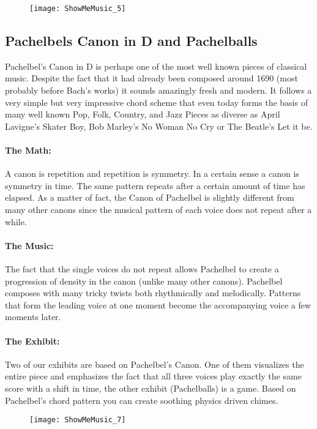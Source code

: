 \begin{figure}[h]
\centering
\texttt{[image: ShowMeMusic\_5]}
\end{figure}


\subsection{Pachelbels Canon in D and Pachelballs}
Pachelbel's Canon in D is perhaps one of the most well known pieces of classical music. Despite the fact that it had already been composed around 1690 (most probably before Bach's works) it sounds amazingly fresh and modern. It follows a very simple but very impressive chord scheme that even today forms the basis of many well known Pop, Folk, Country, and Jazz Pieces as diverse as April Lavigne's Skater Boy, Bob Marley's No Woman No Cry or The Beatle's Let it be.

\paragraph{The Math:} A canon is repetition and repetition is symmetry. In a certain sense a canon is symmetry in time. The same pattern repeats after a certain amount of time has elapsed. As a matter of fact, the Canon of Pachelbel is slightly different from many other canons since the musical pattern of each voice does not repeat after a while.

\paragraph{The Music:} The fact that the single voices do not repeat allows Pachelbel to create a progression of density in the canon (unlike many other canons). Pachelbel composes with many tricky twists both rhythmically and melodically. Patterns that form the leading voice at one moment become the accompanying voice a few moments later.

\paragraph{The Exhibit:} Two of our exhibits are based on Pachelbel's Canon. One of them visualizes the entire piece and emphasizes the fact that all three voices play exactly the same score with a shift in time, the other exhibit (Pachelballs) is a game. Based on Pachelbel's chord pattern you can create soothing physics driven chimes.

\begin{figure}[t]
\centering
\texttt{[image: ShowMeMusic\_7]}
\end{figure}


